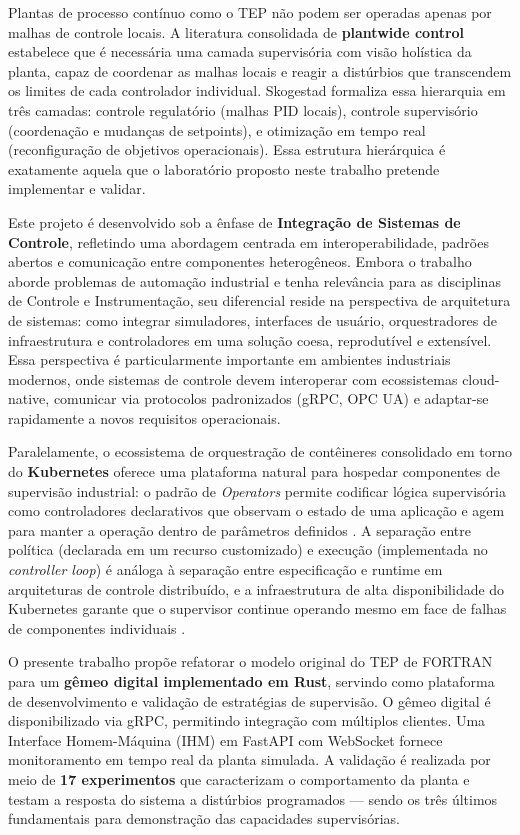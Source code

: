 Plantas de processo contínuo como o TEP não podem ser operadas apenas por malhas de controle locais. A literatura consolidada de \textbf{plantwide control} \cite{Larsson2000, Skogestad2004} estabelece que é necessária uma camada supervisória com visão holística da planta, capaz de coordenar as malhas locais e reagir a distúrbios que transcendem os limites de cada controlador individual. Skogestad formaliza essa hierarquia em três camadas: controle regulatório (malhas PID locais), controle supervisório (coordenação e mudanças de setpoints), e otimização em tempo real (reconfiguração de objetivos operacionais). Essa estrutura hierárquica é exatamente aquela que o laboratório proposto neste trabalho pretende implementar e validar.

Este projeto é desenvolvido sob a ênfase de \textbf{Integração de Sistemas de Controle}, refletindo uma abordagem centrada em interoperabilidade, padrões abertos e comunicação entre componentes heterogêneos. Embora o trabalho aborde problemas de automação industrial e tenha relevância para as disciplinas de Controle e Instrumentação, seu diferencial reside na perspectiva de arquitetura de sistemas: como integrar simuladores, interfaces de usuário, orquestradores de infraestrutura e controladores em uma solução coesa, reprodutível e extensível. Essa perspectiva é particularmente importante em ambientes industriais modernos, onde sistemas de controle devem interoperar com ecossistemas cloud-native, comunicar via protocolos padronizados (gRPC, OPC UA) e adaptar-se rapidamente a novos requisitos operacionais.

Paralelamente, o ecossistema de orquestração de contêineres consolidado em torno do \textbf{Kubernetes} oferece uma plataforma natural para hospedar componentes de supervisão industrial: o padrão de \textit{Operators} permite codificar lógica supervisória como controladores declarativos que observam o estado de uma aplicação e agem para manter a operação dentro de parâmetros definidos \cite{Burns2016}. A separação entre política (declarada em um recurso customizado) e execução (implementada no \textit{controller loop}) é análoga à separação entre especificação e runtime em arquiteturas de controle distribuído, e a infraestrutura de alta disponibilidade do Kubernetes garante que o supervisor continue operando mesmo em face de falhas de componentes individuais \cite{Burns2016}.

O presente trabalho propõe refatorar o modelo original do TEP de FORTRAN para um \textbf{gêmeo digital implementado em Rust}, servindo como plataforma de desenvolvimento e validação de estratégias de supervisão. O gêmeo digital é disponibilizado via gRPC, permitindo integração com múltiplos clientes. Uma Interface Homem-Máquina (IHM) em FastAPI com WebSocket fornece monitoramento em tempo real da planta simulada. A validação é realizada por meio de \textbf{17 experimentos} que caracterizam o comportamento da planta e testam a resposta do sistema a distúrbios programados — sendo os três últimos fundamentais para demonstração das capacidades supervisórias.

